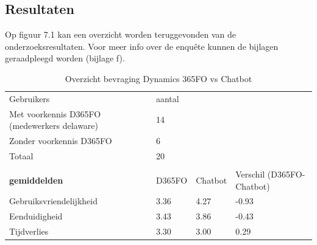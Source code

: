 \subsection{Resultaten}
Op figuur 7.1 kan een overzicht worden teruggevonden van de onderzoeksresultaten. Voor meer info over de enquête kunnen de bijlagen geraadpleegd worden (bijlage f). 
\begin{table}[]
    \begin{tabular}{llll}
        \cline{1-2}
        \multicolumn{1}{|l|}{Gebruikers}                                   & \multicolumn{1}{l|}{aantal} &                              &                                                \\ \cline{1-2}
        \multicolumn{1}{|l|}{Met voorkennis D365FO (medewerkers delaware)} & \multicolumn{1}{l|}{14}     &                              &                                                \\ \cline{1-2}
        \multicolumn{1}{|l|}{Zonder voorkennis D365FO}                     & \multicolumn{1}{l|}{6}      &                              &                                                \\ \cline{1-2}
        \multicolumn{1}{|l|}{Totaal}                                       & \multicolumn{1}{l|}{20}     &                              &                                                \\ \cline{1-2}
        &                             &                              &                                                \\ \hline
        \multicolumn{1}{|l|}{\textbf{gemiddelden}}                         & \multicolumn{1}{l|}{D365FO} & \multicolumn{1}{l|}{Chatbot} & \multicolumn{1}{l|}{Verschil (D365FO-Chatbot)} \\ \hline
        \multicolumn{1}{|l|}{Gebruiksvriendelijkheid}                      & \multicolumn{1}{l|}{3.36}   & \multicolumn{1}{l|}{4.27}    & \multicolumn{1}{l|}{-0.93}                     \\ \hline
        \multicolumn{1}{|l|}{Eenduidigheid}                                & \multicolumn{1}{l|}{3.43}   & \multicolumn{1}{l|}{3.86}    & \multicolumn{1}{l|}{-0.43}                     \\ \hline
        \multicolumn{1}{|l|}{Tijdverlies}                                  & \multicolumn{1}{l|}{3.30}   & \multicolumn{1}{l|}{3.00}    & \multicolumn{1}{l|}{0.29}                      \\ \hline
    \end{tabular}
\caption{\label{tab:Overzicht bevraging Dynamics 365FO vs Chatbot}Overzicht bevraging Dynamics 365FO vs Chatbot}
\end{table}


